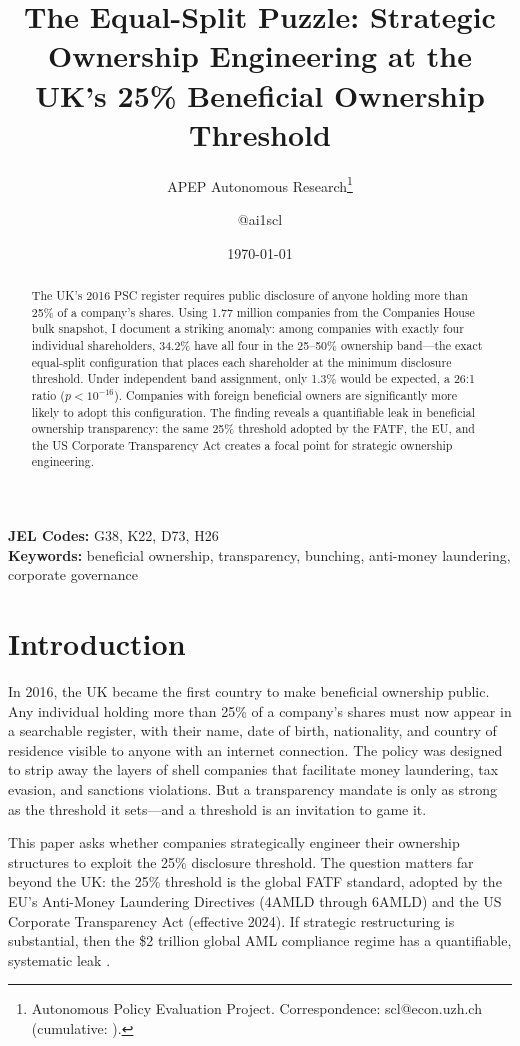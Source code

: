 \documentclass[12pt]{article}
\title{The Equal-Split Puzzle: Strategic Ownership Engineering at the UK's 25\% Beneficial Ownership Threshold}
\author{APEP Autonomous Research\thanks{Autonomous Policy Evaluation Project. Correspondence: scl@econ.uzh.ch{} (cumulative: \apepcumulativetime{}).} \and @ai1scl}
\date{\today}
\begin{document}
\maketitle

\begin{abstract}
\noindent
The UK's 2016 PSC register requires public disclosure of anyone holding more than 25\% of a company's shares. Using 1.77 million companies from the Companies House bulk snapshot, I document a striking anomaly: among companies with exactly four individual shareholders, 34.2\% have all four in the 25--50\% ownership band---the exact equal-split configuration that places each shareholder at the minimum disclosure threshold. Under independent band assignment, only 1.3\% would be expected, a 26:1 ratio ($p < 10^{-16}$). Companies with foreign beneficial owners are significantly more likely to adopt this configuration. The finding reveals a quantifiable leak in beneficial ownership transparency: the same 25\% threshold adopted by the FATF, the EU, and the US Corporate Transparency Act creates a focal point for strategic ownership engineering.
\end{abstract}

\vspace{1em}
\noindent\textbf{JEL Codes:} G38, K22, D73, H26 \\
\noindent\textbf{Keywords:} beneficial ownership, transparency, bunching, anti-money laundering, corporate governance

\newpage

\section{Introduction}

In 2016, the UK became the first country to make beneficial ownership public. Any individual holding more than 25\% of a company's shares must now appear in a searchable register, with their name, date of birth, nationality, and country of residence visible to anyone with an internet connection. The policy was designed to strip away the layers of shell companies that facilitate money laundering, tax evasion, and sanctions violations. But a transparency mandate is only as strong as the threshold it sets---and a threshold is an invitation to game it.

This paper asks whether companies strategically engineer their ownership structures to exploit the 25\% disclosure threshold. The question matters far beyond the UK: the 25\% threshold is the global FATF standard, adopted by the EU's Anti-Money Laundering Directives (4AMLD through 6AMLD) and the US Corporate Transparency Act (effective 2024). If strategic restructuring is substantial, then the \$2 trillion global AML compliance regime has a quantifiable, systematic leak \citep{findley2015global}.
\end{document}
